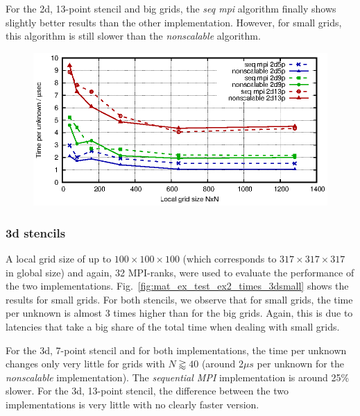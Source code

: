 For the 2d, 13-point stencil and big grids, the \textit{seq mpi} algorithm finally shows slightly better results than the other implementation. However, for small grids, this algorithm is still slower than the \textit{nonscalable} algorithm. 

\begin{figure}[tbp]
	\centering
	\includegraphics[width=1\textwidth]{times_2d}
	\caption{} 
	\label{fig:mat_ex_test_ex2_times_2d}
\end{figure}

\subsubsection*{3d stencils}
A local grid size of up to $100 \times 100 \times 100$ (which corresponds to $317 \times 317 \times 317$ in global size) and again, 32 MPI-ranks, were used to evaluate the performance of the two implementations.  Fig.~\ref{fig:mat_ex_test_ex2_times_3dsmall} shows the results for small grids. For both stencils, we observe that for small grids, the time per unknown is almost 3 times higher than for the big grids. Again, this is due to latencies that take a big share of the total time when dealing with small grids.

For the 3d, 7-point stencil and for both implementations, the time per unknown changes only very little for grids with $N \gtrapprox 40$ (around 2$\mu  s$ per unknown for the \textit{nonscalable} implementation). The \textit{sequential MPI} implementation is around 25\% slower. For the 3d, 13-point stencil, the difference between the two implementations is very little with no clearly faster version. 


